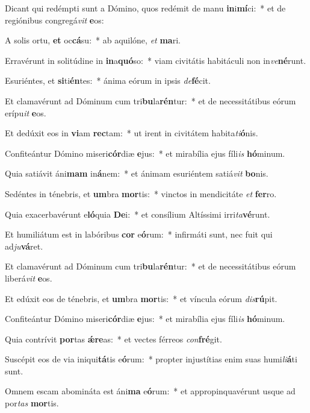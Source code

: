 \item Dicant qui redémpti sunt a Dómino, quos redémit de manu \textbf{in}i\textbf{mí}ci:~* et de regiónibus congregá\textit{vit} \textbf{e}os:
\item A solis ortu, \textbf{et} oc\textbf{cá}su:~* ab aquilóne, \textit{et} \textbf{ma}ri.
\item Erravérunt in solitúdine in \textbf{in}a\textbf{quó}so:~* viam civitátis habitáculi non in\textit{ve}\textbf{né}runt.
\item Esuriéntes, et \textbf{si}ti\textbf{én}tes:~* ánima eórum in ipsis \textit{de}\textbf{fé}cit.
\item Et clamavérunt ad Dóminum cum tri\textbf{bu}la\textbf{rén}tur:~* et de necessitátibus eórum erípu\textit{it} \textbf{e}os.
\item Et dedúxit eos in \textbf{vi}am \textbf{rec}tam:~* ut irent in civitátem habita\textit{ti}\textbf{ó}nis.
\item Confiteántur Dómino miseri\textbf{cór}diæ \textbf{e}jus:~* et mirabília ejus fíli\textit{is} \textbf{hó}minum.
\item Quia satiávit áni\textbf{mam} in\textbf{á}nem:~* et ánimam esuriéntem satiá\textit{vit} \textbf{bo}nis.
\item Sedéntes in ténebris, et \textbf{um}bra \textbf{mor}tis:~* vinctos in mendicitáte \textit{et} \textbf{fer}ro.
\item Quia exacerbavérunt e\textbf{ló}quia \textbf{De}i:~* et consílium Altíssimi irri\textit{ta}\textbf{vé}runt.
\item Et humiliátum est in labóribus \textbf{cor} e\textbf{ó}rum:~* infirmáti sunt, nec fuit qui ad\textit{ju}\textbf{vá}ret.
\item Et clamavérunt ad Dóminum cum tri\textbf{bu}la\textbf{rén}tur:~* et de necessitátibus eórum liberá\textit{vit} \textbf{e}os.
\item Et edúxit eos de ténebris, et \textbf{um}bra \textbf{mor}tis:~* et víncula eórum \textit{dis}\textbf{rú}pit.
\item Confiteántur Dómino miseri\textbf{cór}diæ \textbf{e}jus:~* et mirabília ejus fíli\textit{is} \textbf{hó}minum.
\item Quia contrívit \textbf{por}tas \textbf{ǽ}\textbf{re}as:~* et vectes férreos \textit{con}\textbf{fré}git.
\item Suscépit eos de via iniqui\textbf{tá}tis e\textbf{ó}rum:~* propter injustítias enim suas humi\textit{li}\textbf{á}ti sunt.
\item Omnem escam abomináta est áni\textbf{ma} e\textbf{ó}rum:~* et appropinquavérunt usque ad por\textit{tas} \textbf{mor}tis.
